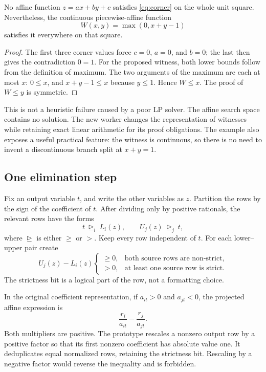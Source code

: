 \begin{proposition}\label{prop:affine-obstruction}
No affine function \(z=ax+by+c\) satisfies \eqref{eq:corner} on the whole unit square. Nevertheless, the continuous piecewise-affine function
\[
 W(x,y)=\max(0,x+y-1)
\]
satisfies it everywhere on that square.
\end{proposition}
\begin{proof}
The first three corner values force \(c=0\), \(a=0\), and \(b=0\); the last then gives the contradiction \(0=1\). For the proposed witness, both lower bounds follow from the definition of maximum. The two arguments of the maximum are each at most \(x\): \(0\le x\), and \(x+y-1\le x\) because \(y\le1\). Hence \(W\le x\). The proof of \(W\le y\) is symmetric.
\end{proof}

This is not a heuristic failure caused by a poor LP solver. The affine search space contains no solution. The new worker changes the representation of witnesses while retaining exact linear arithmetic for its proof obligations. The example also exposes a useful practical feature: the witness is continuous, so there is no need to invent a discontinuous branch split at \(x+y=1\).

\subsection{One elimination step}
Fix an output variable \(t\), and write the other variables as \(z\). Partition the rows by the sign of the coefficient of \(t\). After dividing only by positive rationals, the relevant rows have the forms
\[
 t\ \mathrel{\trianglerighteq_i}\ L_i(z),
 \qquad
 U_j(z)\ \mathrel{\trianglerighteq_j}\ t,
\]
where \(\trianglerighteq\) is either \(\ge\) or \(>\). Keep every row independent of \(t\). For each lower--upper pair create
\begin{equation}\label{eq:pair-row}
 U_j(z)-L_i(z)\begin{cases}
 \ge0,&\text{both source rows are non-strict},\\
 >0,&\text{at least one source row is strict}.
 \end{cases}
\end{equation}
The strictness bit is a logical part of the row, not a formatting choice.

In the original coefficient representation, if \(a_{it}>0\) and \(a_{jt}<0\), the projected affine expression is
\begin{equation}\label{eq:fm-combination}
 \frac{r_i}{a_{it}}-\frac{r_j}{a_{jt}}.
\end{equation}
Both multipliers are positive. The prototype rescales a nonzero output row by a positive factor so that its first nonzero coefficient has absolute value one. It deduplicates equal normalized rows, retaining the strictness bit. Rescaling by a negative factor would reverse the inequality and is forbidden.

